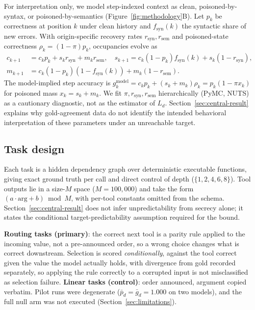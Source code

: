 \documentclass{article}
\begin{document}
For interpretation only, we model step-indexed context as clean, poisoned-by-syntax, or poisoned-by-semantics (Figure~\ref{fig:methodology}B). Let $p_k$ be correctness at position $k$ under clean history and $f_{\mathrm{syn}}(k)$ the syntactic share of new errors. With origin-specific recovery rates $r_{\mathrm{syn}},r_{\mathrm{sem}}$ and poisoned-state correctness $\rho_k=(1-\pi)p_k$, occupancies evolve as
\begin{align}
c_{k+1} &= c_kp_k+s_kr_{\mathrm{syn}}+m_kr_{\mathrm{sem}}, \quad
s_{k+1} = c_k(1-p_k)f_{\mathrm{syn}}(k)+s_k(1-r_{\mathrm{syn}}), \\
m_{k+1} &= c_k(1-p_k)(1-f_{\mathrm{syn}}(k))+m_k(1-r_{\mathrm{sem}}).
\end{align}
The model-implied step accuracy is $g_k^{\mathrm{model}}=c_kp_k+(s_k+m_k)\rho_k=p_k(1-\pi x_k)$ for poisoned mass $x_k=s_k+m_k$. We fit $\pi,r_{\mathrm{syn}},r_{\mathrm{sem}}$ hierarchically (PyMC, NUTS) as a cautionary diagnostic, not as the estimator of $L_d$. Section~\ref{sec:central-result} explains why gold-agreement data do not identify the intended behavioral interpretation of these parameters under an unreachable target.

\subsection{Task design}

Each task is a hidden dependency graph over deterministic executable functions, giving exact ground truth per call and direct control of depth ($\{1,2,4,6,8\}$). Tool outputs lie in a size-$M$ space ($M=100{,}000$) and take the form $(a\cdot\mathrm{arg}+b)\bmod M$, with per-tool constants omitted from the schema. Section~\ref{sec:central-result} does not infer unpredictability from secrecy alone; it states the conditional target-predictability assumption required for the bound.

\textbf{Routing tasks (primary)}: the correct next tool is a parity rule applied to the incoming value, not a pre-announced order, so a wrong choice changes what is correct downstream. Selection is scored \emph{conditionally}, against the tool correct given the value the model actually holds, with divergence from gold recorded separately, so applying the rule correctly to a corrupted input is not misclassified as selection failure. \textbf{Linear tasks (control)}: order announced, argument copied verbatim. Pilot runs were degenerate ($\bar p_d=\bar g_d=1.000$ on two models), and the full null arm was not executed (Section~\ref{sec:limitations}).
\end{document}
